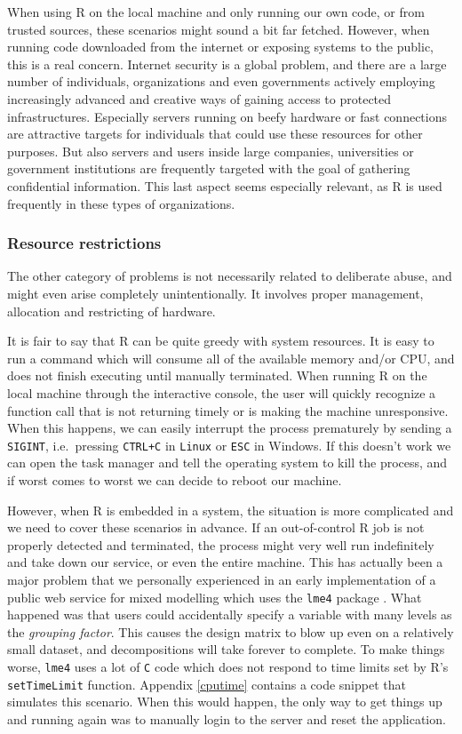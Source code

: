 \documentclass{jss}
\newcommand{\R}{\textsf{R}\xspace}
\newcommand{\Linux}{\texttt{Linux}\xspace}
\begin{document}
When using \R on the local machine and only running our own code, or
from trusted sources, these scenarios might sound a bit far fetched. However,
when running code downloaded from the internet or exposing systems to the
public, this is a real concern. Internet security is a global problem,
and there are a large number of individuals, organizations and even governments
actively employing increasingly advanced and creative ways of gaining access to
protected infrastructures. Especially servers running on beefy hardware or
fast connections are attractive targets for individuals that could use these
resources for other purposes. But also servers and users inside large companies,
universities or government institutions are frequently targeted with the goal
of gathering confidential information. This last aspect seems especially
relevant, as \R is used frequently in these types of organizations.

\subsubsection{Resource restrictions}

The other category of problems is not necessarily related to deliberate abuse, and
might even arise completely unintentionally. It involves proper management, 
allocation and restricting of hardware. 

It is fair to say that \R can be quite greedy with system resources.
It is easy to run a command which will consume all of the available memory
and/or CPU, and does not finish executing until manually terminated. When
running \R on the local machine through the interactive console, the
user will quickly recognize a function call that is not returning timely or is
making the machine unresponsive. When this happens, we can easily interrupt the
process prematurely by sending a \texttt{SIGINT}, i.e.\ pressing \texttt{CTRL+C}
in \Linux or \texttt{ESC} in Windows. If this doesn't work we can open the task
manager and tell the operating system to kill the process, and if worst comes
to worst we can decide to reboot our machine.

However, when \R is embedded in a system, the situation is
more complicated and we need to cover these scenarios in advance. If
an out-of-control \R job is not properly detected and terminated, the process
might very well run indefinitely and take down our service, or even the entire machine. This has
actually been a major problem that we personally experienced in an early
implementation of a public web service for mixed modelling \citep{yeroonlme4}
which uses the \texttt{lme4} package \citep{lme4}. What happened was that users
could accidentally specify a variable with many levels as the \emph{grouping
factor}. This causes the design matrix to blow up even on a relatively
small dataset, and decompositions will take forever to complete. To make
things worse, \texttt{lme4} uses a lot of \texttt{C} code which does not
respond to time limits set by R's \texttt{setTimeLimit} function. Appendix
\ref{cputime} contains a code snippet that simulates this scenario. When this
would happen, the only way to get things up and running again was to manually
login to the server and reset the application.
\end{document}
